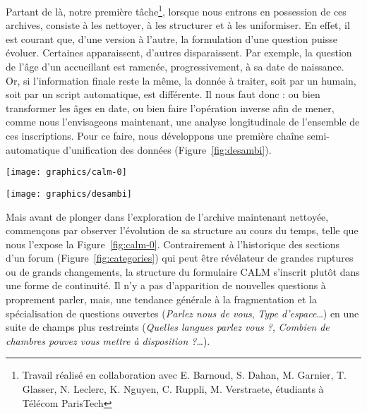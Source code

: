 \documentclass[symmetric,justified,marginals=raggedouter]{tufte-book}
\begin{document}
Partant de là, notre première tâche\footnote{\RaggedOuter Travail réalisé en collaboration avec E. Barnoud, S. Dahan, M. Garnier, T. Glasser, N. Leclerc, K. Nguyen, C. Ruppli, M. Verstraete, étudiants à Télécom ParisTech}, lorsque nous entrons en possession de ces archives, consiste à les nettoyer, à les structurer et à les uniformiser. En effet, il est courant que, d'une version à l'autre, la formulation d'une question puisse évoluer. Certaines apparaissent, d'autres disparaissent. Par exemple, la question de l'âge d'un accueillant est ramenée, progressivement, à sa date de naissance. Or, si l'information finale reste la même, la donnée à traiter, soit par un humain, soit par un script automatique, est différente. Il nous faut donc : ou bien transformer les âges en date, ou bien  faire l'opération inverse afin de mener, comme nous l'envisageons maintenant, une analyse longitudinale de l'ensemble de ces inscriptions. Pour ce faire, nous développons une première chaîne semi-automatique d'unification des données (Figure~\ref{fig:desambi}).

\begin{figure*}
  \texttt{[image: graphics/calm-0]}
  \caption{Évolution de la structure du questionnaire des accueillants}
  \label{fig:calm-0}
\end{figure*}

\newpage

\begin{marginfigure}%
  \texttt{[image: graphics/desambi]}
  \vspace*{0.2cm}  
  \caption{Unification des différentes versions d'une même base de données}
  \label{fig:desambi}
\end{marginfigure} 

\noindent Mais avant de plonger dans l'exploration de l'archive maintenant nettoyée, commençons par observer l'évolution de sa structure au cours du temps, telle que nous l'expose la Figure~\ref{fig:calm-0}. Contrairement à l'historique des sections d'un forum (Figure~\ref{fig:categories}) qui peut être révélateur de grandes ruptures ou de grands changements, la structure du formulaire CALM s'inscrit plutôt dans une forme de continuité. Il n'y a pas d'apparition de nouvelles questions à proprement parler, mais, une tendance générale à la fragmentation et la spécialisation de questions ouvertes (\textit{Parlez nous de vous}, \textit{Type d'espace}\ldots{}) en une suite de champs plus restreints (\textit{Quelles langues parlez vous ?}, \textit{Combien de chambres pouvez vous mettre à disposition ?}\ldots{}). 
\end{document}

